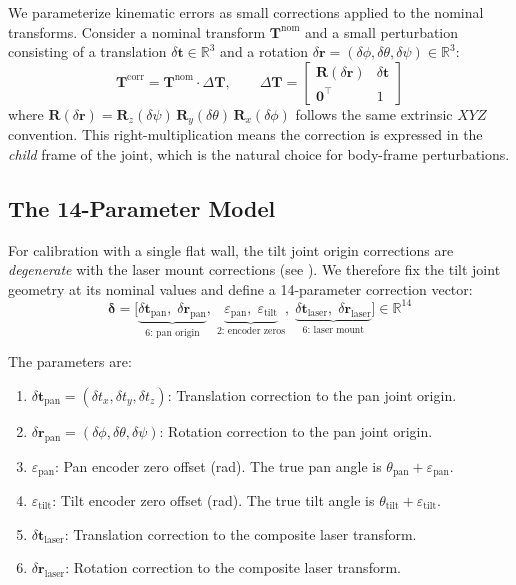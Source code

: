 \documentclass[12pt,a4paper]{article}
\newcommand{\R}{\mathbb{R}}
\newcommand{\T}{\mathbf{T}}
\newcommand{\Rot}{\mathbf{R}}
\begin{document}
We parameterize kinematic errors as small corrections applied to the
nominal transforms. Consider a nominal transform $\T^{\text{nom}}$ and
a small perturbation consisting of a translation $\delta\mathbf{t} \in \R^3$
and a rotation $\delta\mathbf{r} = (\delta\phi, \delta\theta, \delta\psi) \in \R^3$:
\begin{equation}
    \T^{\text{corr}} = \T^{\text{nom}} \cdot \Delta\T, \qquad
    \Delta\T =
    \begin{bmatrix}
        \Rot(\delta\mathbf{r}) & \delta\mathbf{t} \\
        \mathbf{0}^\top & 1
    \end{bmatrix}
    \label{eq:correction}
\end{equation}
where $\Rot(\delta\mathbf{r}) = \Rot_z(\delta\psi)\,\Rot_y(\delta\theta)\,\Rot_x(\delta\phi)$
follows the same extrinsic $XYZ$ convention. This right-multiplication
means the correction is expressed in the \emph{child} frame of the joint,
which is the natural choice for body-frame perturbations.

\subsection{The 14-Parameter Model}
\label{sec:14param}

For calibration with a single flat wall, the tilt joint origin corrections
are \emph{degenerate} with the laser mount corrections (see ).
We therefore fix the tilt joint geometry at its nominal values and define
a 14-parameter correction vector:
\begin{equation}
    \bm{\delta} =
    \bigl[\underbrace{\delta\mathbf{t}_{\text{pan}},\; \delta\mathbf{r}_{\text{pan}}}_{\text{6: pan origin}},\;
    \underbrace{\varepsilon_{\text{pan}},\; \varepsilon_{\text{tilt}}}_{\text{2: encoder zeros}},\;
    \underbrace{\delta\mathbf{t}_{\text{laser}},\; \delta\mathbf{r}_{\text{laser}}}_{\text{6: laser mount}}\bigr]
    \in \R^{14}
    \label{eq:delta}
\end{equation}

The parameters are:
\begin{enumerate}[nosep]
    \item $\delta\mathbf{t}_{\text{pan}} = (\delta t_x, \delta t_y, \delta t_z)$:
          Translation correction to the pan joint origin.
    \item $\delta\mathbf{r}_{\text{pan}} = (\delta\phi, \delta\theta, \delta\psi)$:
          Rotation correction to the pan joint origin.
    \item $\varepsilon_{\text{pan}}$: Pan encoder zero offset (rad). The true pan angle
          is $\theta_{\text{pan}} + \varepsilon_{\text{pan}}$.
    \item $\varepsilon_{\text{tilt}}$: Tilt encoder zero offset (rad). The true tilt angle
          is $\theta_{\text{tilt}} + \varepsilon_{\text{tilt}}$.
    \item $\delta\mathbf{t}_{\text{laser}}$: Translation correction to the composite
          laser transform.
    \item $\delta\mathbf{r}_{\text{laser}}$: Rotation correction to the composite
          laser transform.
\end{enumerate}
\end{document}
